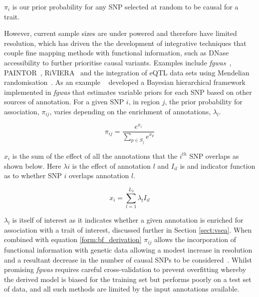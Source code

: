 \documentclass[a4paper,11pt]{report}
\begin{document}
$\pi_{i}$ is our prior probability for any SNP selected at random to be causal for a trait. 

However, current sample sizes are under powered and therefore have limited resolution, which has driven the the development of integrative techniques that couple fine mapping methods with functional information, such as DNase accessibility to further prioritise causal variants. Examples include \textit{fgwas}~\citep{Pickrell2014-xs}, PAINTOR~\citep{KichaevYangLindstromEtAl2014}, RiVIERA~\citep{LiKellis2016}   and the integration of eQTL data sets using Mendelian randomisation~\citep{ZhuZhangHuEtAl2016}. As an example ~\citet{Pickrell2014-xs} developed a Bayesian hierarchical framework implemented in \textit{fgwas} that estimates variable priors for each SNP based on other sources of annotation. For a given SNP $i$, in region $j$, the prior probability for association, $\pi_{ij}$, varies depending on the enrichment of annotations, $\lambda_{l}$. 

\begin{equation}
	\pi_{ij} = \frac{e^{x_{i}}}{\sum_{p \in S_j}e^{x_{p}}}
	\label{eqn:fgwas_var_prior}
\end{equation}

$x_i$ is the sum of the effect of all the annotations that the $i^{th}$ SNP overlaps as shown below.  Here $\lambda{i}$ is the effect of annotation $l$ and $I_{il}$ is and indicator function as to whether SNP $i$ overlaps annotation $l$.  

\begin{equation}
	x_{i} = \sum_{l=1}^{L_{2}} \lambda_{l}I_{il}
	\label{eqn:fgwas_lambda}
\end{equation}

$\lambda_{l}$ is itself of interest as it indicates whether a given annotation is enriched for association with a trait of interest, discussed further in Section \ref{sect:vsea}. When combined with equation \ref{form:bf_derivation} $\pi_{ij}$ allows the incorporation of functional information with genetic data allowing a modest increase in resolution and a resultant decrease in the number of causal SNPs to be considered~\citep{Pickrell2014-xs}. Whilst promising \textit{fgwas} requires careful cross-validation to prevent overfitting whereby the derived model is biased for the training set but performs poorly on a test set of data, and all such methods are limited by the input annotations available.
\end{document}

